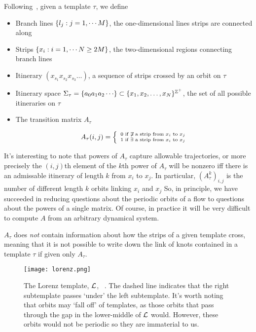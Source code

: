 \documentclass[main.tex]{subfiles}
\begin{document}
\begin{definition}
  Following~\cite{knottyode}, given a template $\tau$, we define
  \begin{itemize}
    \item Branch lines  $\{ l_j : j = 1, \cdots M \}$, the one-dimensional lines strips are connected along
    \item Strips $\{ x_i : i = 1, \cdots N \geq 2 M \}$, the two-dimensional regions connecting branch lines
    \item Itinerary $(x_{s_1}x_{s_2}x_{s_3} \dots)$, a sequence of strips crossed by an orbit on $\tau$
    \item Itinerary space $\Sigma_\tau = \set{a_0 a_1 a_2 \cdots} \subset \set{x_1, x_2, \ldots, x_N}^{\Z^+}$, the set of all possible itineraries on $\tau$
    \item The transition matrix $A_\tau$

      \begin{equation}
        A_\tau(i,j) = \left\{ \
        \begin{smallmatrix}
          0 \text{ if } \not\exists \text{ a strip from } x_i \text{ to } x_j \\
          1 \text{ if } \exists \text{ a strip from } x_i \text{ to } x_j
        \end{smallmatrix}
        \right.
      \end{equation}
  \end{itemize}
\end{definition}

It's interesting to note that powers of $A_\tau$ capture allowable trajectories, or more precisely the $(i,j)$th element of the $k$th power of $A_\tau$ will be nonzero iff there is an admissable itinerary of length
$k$ from $x_i$ to $x_j$.
In particular, ${(A_\tau^k)}_{i,j}$ is the number of different length $k$ orbits linking $x_i$ and $x_j$
So, in principle, we have succeeded in reducing questions about the periodic orbits of a flow to questions about the powers of a single matrix. Of course, in practice it will be very difficult to compute $A$ from an arbitrary
dynamical system.

$A_\tau$ does \emph{not} contain information about how the strips of a given template cross, meaning that it is not possible to write down the link of knots contained in a template $\tau$ if given only $A_\tau$.

\begin{figure}[h]
  \centering
  \texttt{[image: lorenz.png]}
  \caption{The Lorenz template, $\mathcal{L}$, ~\cite{knottyode}. The dashed line indicates that the right subtemplate passes `under' the left subtemplate. It's worth noting that orbits may `fall off' of templates, as those orbits
  that pass through the gap in the lower-middle of $\mathcal{L}$ would. However, these orbits would not be periodic so they are immaterial to us.}\label{fig:lorenz}
\end{figure}
\end{document}
